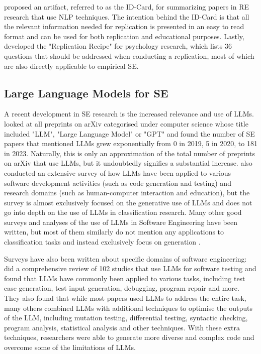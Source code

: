 \documentclass[a4paper]{article}
\begin{document}
\textcite{Abualhaija2024} proposed an artifact, referred to as the ID-Card, for summarizing papers in RE research that use NLP techniques. The intention behind the ID-Card is that all the relevant information needed for replication is presented in an easy to read format and can be used for both replication and educational purposes. Lastly, \textcite{Brandt2014} developed the "Replication Recipe" for psychology research, which lists 36 questions that should be addressed when conducting a replication, most of which are also directly applicable to empirical SE. 

\subsection{Large Language Models for SE}
A recent development in SE research is the increased relevance and use of LLMs. \textcite{fan2023} looked at all preprints on arXiv categorised under computer science whose title included "LLM", "Large Language Model" or "GPT" and found the number of SE papers that mentioned LLMs grew exponentially from 0 in 2019, 5 in 2020, to 181 in 2023. Naturally, this is only an approximation of the total number of preprints on arXiv that use LLMs, but it undoubtedly signifies a substantial increase. \citeauthor{fan2023} also conducted an extensive survey of how LLMs have been applied to various software development activities (such as code generation and testing) and research domains (such as human-computer interaction and education), but the survey is almost exclusively focused on the generative use of LLMs and does not go into depth on the use of LLMs in classification research. Many other good surveys and analyses of the use of LLMs in Software Engineering have been written, but most of them similarly do not mention any applications to classification tasks and instead exclusively focus on generation \cite{Belzner2024,Zheng2024,Ozkaya2023}.

Surveys have also been written about specific domains of software engineering: \textcite{wang2024} did a comprehensive review of 102 studies that use LLMs for software testing and found that LLMs have commonly been applied to various tasks, including test case generation, test input generation, debugging, program repair and more. They also found that while most papers used LLMs to address the entire task, many others combined LLMs with additional techniques to optimise the outputs of the LLM, including mutation testing, differential testing, syntactic checking, program analysis, statistical analysis and other techniques. With these extra techniques, researchers were able to generate more diverse and complex code and overcome some of the limitations of LLMs. 
\end{document}
